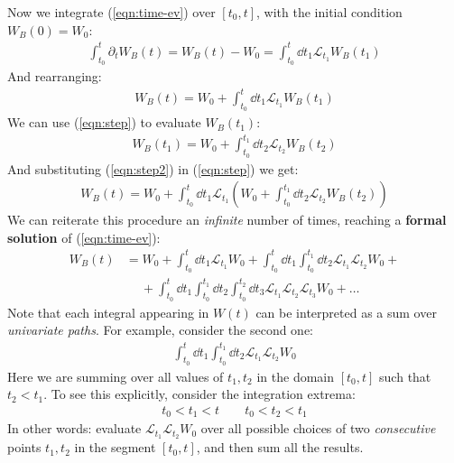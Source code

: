 \documentclass[../template.tex]{subfiles}
\begin{document}
\begin{exo}
\begin{enumerate}
        Now we integrate (\ref{eqn:time-ev}) over $[t_0,t]$, with the initial condition $W_B(0) = W_0$:
        \begin{align*}
            \int_{t_0}^t \partial_t W_B(t) = W_B(t) - W_0 =  \int_{t_0}^t \dd{t_1} \mathcal{L}_{t_1} W_B(t_1)
        \end{align*}
        And rearranging:
        \begin{align} \label{eqn:step}
            W_B(t) = W_0 +\int_{t_0}^t \dd{t_1} \mathcal{L}_{t_1} W_B(t_1) 
        \end{align}
        We can use (\ref{eqn:step}) to evaluate $W_B(t_1)$:
        \begin{align} \label{eqn:step2}
            W_B(t_1) = W_0 + \int_{t_0}^{t_1} \dd{t_2} \mathcal{L}_{t_2} W_B(t_2)
        \end{align}
        And substituting (\ref{eqn:step2}) in (\ref{eqn:step}) we get:
        \begin{align*}
            W_B(t) = W_0 +\int_{t_0}^t \dd{t_1} \mathcal{L}_{t_1} \left(W_0 + \int_{t_0}^{t_1} \dd{t_2} \mathcal{L}_{t_2} W_B(t_2)\right)
        \end{align*}
        We can reiterate this procedure an \textit{infinite} number of times, reaching a \textbf{formal solution} of (\ref{eqn:time-ev}):
        \begin{align} \label{eqn:formal-solution1}
            W_B(t)  &= W_0 + \int_{t_0}^t \dd{t_1} \mathcal{L}_{t_1} W_0 + \int_{t_0}^{t} \dd{t_1} \int_{t_0}^{t_1} \dd{t_2} \mathcal{L}_{t_1} \mathcal{L}_{t_2} W_0 + \\ \nonumber
            &\quad \> + \int_{t_0}^t \dd{t_1} \int_{t_0}^{t_1} \dd{t_2} \int_{t_0}^{t_2} \dd{t_3} \mathcal{L}_{t_1} \mathcal{L}_{t_2} \mathcal{L}_{t_3} W_0 + \dots
        \end{align} 
        Note that each integral appearing in $W(t)$ can be interpreted as a sum over \textit{univariate paths}. For example, consider the second one:
        \begin{align}\label{eqn:int-ex}
            \int_{t_0}^{t} \dd{t_1} \int_{t_0}^{t_1} \dd{t_2} \mathcal{L}_{t_1} \mathcal{L}_{t_2} W_0 
        \end{align} 
        Here we are summing over all values of $t_1, t_2$ in the domain $[t_0,t]$ such that $t_2 < t_1$. To see this explicitly, consider the integration extrema:
        \begin{align*}
            t_0 < t_1 < t \qquad t_0 < t_2 < t_1
        \end{align*}
        In other words: evaluate $\mathcal{L}_{t_1} \mathcal{L}_{t_2} W_0$ over all possible choices of two \textit{consecutive} points $t_1, t_2$ in the segment $[t_0,t]$, and then sum all the results.
     

\end{enumerate}
\end{exo}
\end{document}
